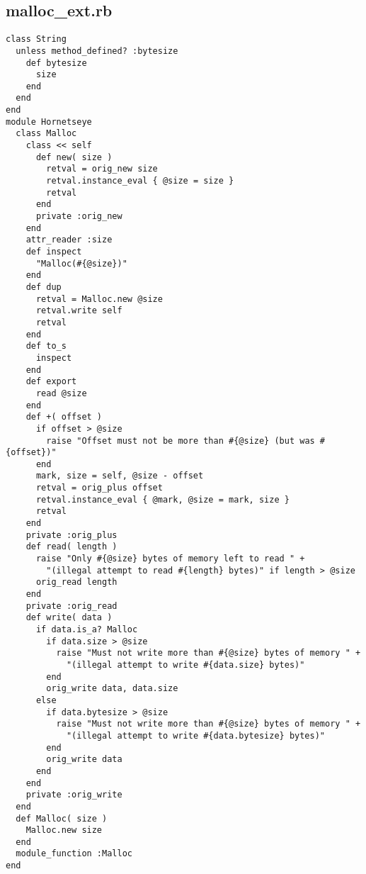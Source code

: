 \subsection{malloc\_ext.rb}\label{cha:malloc-ext-rb}
\begin{lstlisting}
class String
  unless method_defined? :bytesize
    def bytesize
      size
    end
  end
end
module Hornetseye
  class Malloc
    class << self
      def new( size )
        retval = orig_new size
        retval.instance_eval { @size = size }
        retval
      end
      private :orig_new
    end
    attr_reader :size
    def inspect
      "Malloc(#{@size})"
    end
    def dup
      retval = Malloc.new @size
      retval.write self
      retval
    end
    def to_s
      inspect
    end
    def export
      read @size
    end
    def +( offset )
      if offset > @size
        raise "Offset must not be more than #{@size} (but was #{offset})"
      end
      mark, size = self, @size - offset
      retval = orig_plus offset
      retval.instance_eval { @mark, @size = mark, size }
      retval
    end
    private :orig_plus
    def read( length )
      raise "Only #{@size} bytes of memory left to read " +
        "(illegal attempt to read #{length} bytes)" if length > @size
      orig_read length
    end
    private :orig_read
    def write( data )
      if data.is_a? Malloc
        if data.size > @size
          raise "Must not write more than #{@size} bytes of memory " +
            "(illegal attempt to write #{data.size} bytes)"
        end
        orig_write data, data.size
      else
        if data.bytesize > @size
          raise "Must not write more than #{@size} bytes of memory " +
            "(illegal attempt to write #{data.bytesize} bytes)"
        end
        orig_write data
      end
    end
    private :orig_write
  end
  def Malloc( size )
    Malloc.new size
  end
  module_function :Malloc
end
\end{lstlisting}
